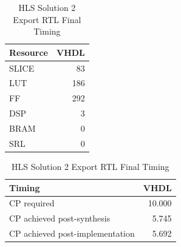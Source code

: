 \begin{table}[H]
	\centering
	\begin{minipage}[t]{0.45\linewidth}
		\centering
		\begin{tabular}{|l|r|}
			\hline
			\textbf{Resource} & \textbf{VHDL} \\
			\hline
			SLICE & 83 \\
			\hline
			LUT & 186 \\
			\hline
			FF & 292 \\
			\hline
			DSP & 3 \\
			\hline
			BRAM & 0 \\
			\hline
			SRL & 0 \\
			\hline
		\end{tabular}
		\caption{HLS Solution 2t Export RTL Resource Usage}
		\label{tab:hls-solution-2-export-rtl-resoruce-usage}
	\end{minipage}
	\hfill
	\begin{minipage}[t]{0.45\linewidth}
		\centering
		\begin{tabular}{|l|r|}
			\hline
			\textbf{Timing} & \textbf{VHDL} \\
			\hline
			CP required & 10.000 \\
			\hline
			CP achieved post-synthesis & 5.745 \\
			\hline
			CP achieved post-implementation & 5.692 \\
			\hline
		\end{tabular}
		\caption{HLS Solution 2 Export RTL Final Timing}
		\label{tab:hls-solution-2-export-rtl-final-timing}
	\end{minipage}
\end{table}